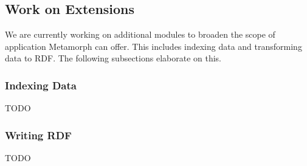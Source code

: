 \documentclass[12pt,a4paper]{article}
\begin{document}
\subsection{Work on Extensions}
We are currently working on additional modules to broaden the scope of application Metamorph can offer.
This includes indexing data and transforming data to RDF. The following subsections elaborate on this.

\subsubsection{Indexing Data}
TODO

\subsubsection{Writing RDF}
TODO
\end{document}

